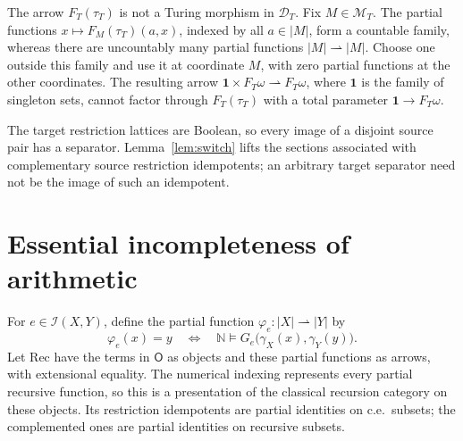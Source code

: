 \documentclass[11pt]{article}
\newcommand{\N}{\mathbb N}
\begin{document}
The arrow $F_T(\tau_T)$ is not a Turing morphism in $\mathcal D_T$.
Fix $M\in\mathcal M_T$. The partial functions
$x\mapsto F_M(\tau_T)(a,x)$, indexed by all $a\in|M|$, form a
countable family, whereas there are uncountably many partial
functions $|M|\rightharpoonup|M|$.
Choose one outside this family and use it at coordinate $M$,
with zero partial functions at the other coordinates.
The resulting arrow
$\mathbf1\times F_T\omega\rightharpoonup F_T\omega$,
where $\mathbf1$ is the family of singleton sets, cannot factor
through $F_T(\tau_T)$ with a total parameter
$\mathbf1\to F_T\omega$.

The target restriction lattices are Boolean, so every image of a disjoint source
pair has a separator. Lemma~\ref{lem:switch} lifts the sections
associated with complementary source restriction idempotents;
an arbitrary target separator need not be the image of such an
idempotent.

\section{Essential incompleteness of arithmetic}\label{sec:arithmetic}

For $e\in\mathcal I(X,Y)$, define the partial function
$\varphi_e:|X|\rightharpoonup|Y|$ by
\[
 \varphi_e(x)=y\quad\Longleftrightarrow\quad
 \N\models G_e\bigl(\gamma_X(x),\gamma_Y(y)\bigr).
\]
Let $\mathrm{Rec}$ have the terms in $\mathsf O$ as objects and
these partial functions as arrows, with extensional equality.
The numerical indexing represents every partial recursive function,
so this is a presentation of the classical recursion category
on these objects.
Its restriction idempotents are partial identities on c.e.\ subsets;
the complemented ones are partial identities on recursive subsets.
\end{document}
